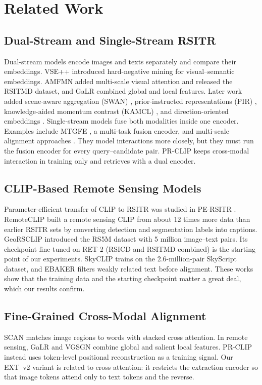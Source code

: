 \documentclass[conference]{IEEEtran}
\begin{document}
\section{Related Work}

\subsection{Dual-Stream and Single-Stream RSITR}
Dual-stream models encode images and texts separately and compare their embeddings. VSE++ \cite{faghri2018vsepp} introduced hard-negative mining for visual--semantic embeddings. AMFMN \cite{yuan2022amfmn} added multi-scale visual attention and released the RSITMD dataset, and GaLR \cite{yuan2022galr} combined global and local features. Later work added scene-aware aggregation (SWAN) \cite{pan2023swan}, prior-instructed representations (PIR) \cite{pan2023pir}, knowledge-aided momentum contrast (KAMCL) \cite{ji2023kamcl}, and direction-oriented embeddings \cite{ma2024direction}. Single-stream models fuse both modalities inside one encoder. Examples include MTGFE \cite{zhang2023mtgfe}, a multi-task fusion encoder, and multi-scale alignment approaches \cite{yang2024transcending}. They model interactions more closely, but they must run the fusion encoder for every query--candidate pair. PR-CLIP \cite{guan2025prclip} keeps cross-modal interaction in training only and retrieves with a dual encoder.

\subsection{CLIP-Based Remote Sensing Models}
Parameter-efficient transfer of CLIP to RSITR was studied in PE-RSITR \cite{yuan2023pe}. RemoteCLIP \cite{liu2024remoteclip} built a remote sensing CLIP from about 12 times more data than earlier RSITR sets by converting detection and segmentation labels into captions. GeoRSCLIP \cite{zhang2024georsclip} introduced the RS5M dataset with 5 million image--text pairs. Its checkpoint fine-tuned on RET-2 (RSICD and RSITMD combined) is the starting point of our experiments. SkyCLIP \cite{wang2024skyclip} trains on the 2.6-million-pair SkyScript dataset, and EBAKER \cite{ji2024ebaker} filters weakly related text before alignment. These works show that the training data and the starting checkpoint matter a great deal, which our results confirm.

\subsection{Fine-Grained Cross-Modal Alignment}
SCAN \cite{lee2018scan} matches image regions to words with stacked cross attention. In remote sensing, GaLR \cite{yuan2022galr} and VGSGN \cite{he2024vgsgn} combine global and salient local features. PR-CLIP \cite{guan2025prclip} instead uses token-level positional reconstruction as a training signal. Our EXT~v2 variant is related to cross attention: it restricts the extraction encoder so that image tokens attend only to text tokens and the reverse.
\end{document}
